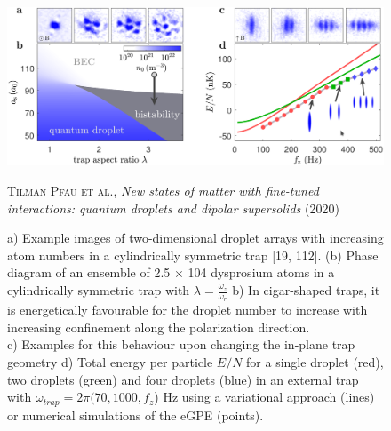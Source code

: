 \begin{figure}[H]
    \centering
    \includegraphics[width=1.0\textwidth]{IMAGE/external_trap.png}\\
    \caption{
        a) Example images of two-dimensional droplet arrays with increasing
           atom numbers in a cylindrically symmetric trap [19, 112]. (b) Phase diagram of an
           ensemble of 2.5 × 104 dysprosium atoms in a cylindrically symmetric trap with $\lambda = \frac{\omega_{z}}{\omega_{r}}$
        b) In cigar-shaped traps, it is energetically favourable for the droplet number to increase with
           increasing confinement along the polarization direction. \\
        c) Examples for this behaviour upon changing the in-plane trap geometry
        d) Total energy per particle $E/N$ for a single droplet (red), two droplets (green) and four droplets (blue)
           in an external trap with $\omega_{trap} = 2\pi (70, 1000, f_{z}$) Hz using a variational approach (lines)
           or numerical simulations of the eGPE (points).
      }
    \textsc{Tilman Pfau et al.}, \emph{New states of matter with fine-tuned interactions:
        quantum droplets and dipolar supersolids} (2020)
    \label{fig:external_trap}
\end{figure}

